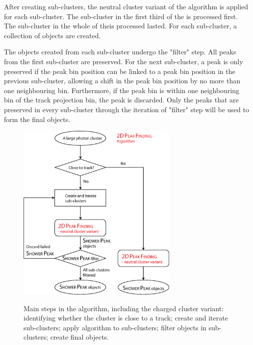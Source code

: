 After creating sub-clusters, the neutral cluster variant of the  \peakFinding algorithm is applied for each sub-cluster.  The sub-cluster in the first third of the \ECAL is processed first. The sub-cluster in the whole of the\ECAL is processed lasted. For each sub-cluster, a collection of \ShowerPeak objects are created.

The \ShowerPeak objects created from each sub-cluster undergo the "\ShowerPeak filter" step. All peaks from the first sub-cluster are preserved. For the next sub-cluster, a peak  is only preserved if the peak bin position can be linked to a peak bin position in the previous sub-cluster, allowing a shift in the peak bin position by no more than one neighbouring bin. Furthermore, if the peak bin is within one neighbouring bin of the track projection bin, the peak is discarded. Only the peaks that are preserved in every sub-cluster through the iteration of "\ShowerPeak filter" step will be used to form the final \ShowerPeak objects.


\begin{figure}[tbph]
\centering
{\includegraphics[width=0.7\textwidth]{photon/2DpeakFindingTrack}}
\caption[Flow chart for \peakFinding algorithm.]
{Main steps in the  \peakFinding algorithm, including the charged cluster variant: identifying whether the cluster is close to a track; create and iterate sub-clusters; apply \peakFinding algorithm to sub-clusters; filter \ShowerPeak objects in sub-clusters; create final \ShowerPeak objects.}
\label{fig:photonPeakFindingFlow}
\end{figure}


